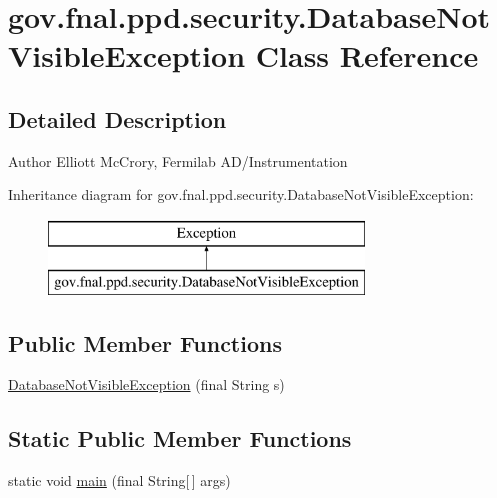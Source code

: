\hypertarget{classgov_1_1fnal_1_1ppd_1_1security_1_1DatabaseNotVisibleException}{\section{gov.\-fnal.\-ppd.\-security.\-Database\-Not\-Visible\-Exception Class Reference}
\label{classgov_1_1fnal_1_1ppd_1_1security_1_1DatabaseNotVisibleException}
}


\subsection{Detailed Description}
\begin{DoxyAuthor}{Author}
Elliott Mc\-Crory, Fermilab A\-D/\-Instrumentation 
\end{DoxyAuthor}
Inheritance diagram for gov.\-fnal.\-ppd.\-security.\-Database\-Not\-Visible\-Exception\-:\begin{figure}[H]
\begin{center}
\leavevmode
\includegraphics[height=2.000000cm]{classgov_1_1fnal_1_1ppd_1_1security_1_1DatabaseNotVisibleException}
\end{center}
\end{figure}
\subsection*{Public Member Functions}
\begin{DoxyCompactItemize}
\item 
\hyperlink{classgov_1_1fnal_1_1ppd_1_1security_1_1DatabaseNotVisibleException_a32f650c9cc95fb8fe0951d92a68c8069}{Database\-Not\-Visible\-Exception} (final String s)
\end{DoxyCompactItemize}
\subsection*{Static Public Member Functions}
\begin{DoxyCompactItemize}
\item 
static void \hyperlink{classgov_1_1fnal_1_1ppd_1_1security_1_1DatabaseNotVisibleException_a82075ee14623f4d7eca9f622a8551e2f}{main} (final String\mbox{[}$\,$\mbox{]} args)
\end{DoxyCompactItemize}


